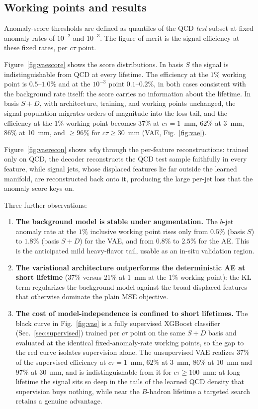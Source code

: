 \documentclass[a4paper,11pt]{article}
\newcommand{\ctau}{c\tau}
\begin{document}
\subsection{Working points and results}
\label{sec:adresults}

Anomaly-score thresholds are defined as quantiles of the QCD
\emph{test} subset at fixed anomaly rates of $10^{-2}$ and $10^{-3}$.
The figure of merit is the signal efficiency at these fixed rates,
per $\ctau$ point.

Figure~\ref{fig:vaescore} shows the score distributions. In basis $S$
the signal is indistinguishable from QCD at every lifetime. The
efficiency at the $1\%$ working point is $0.5$--$1.0\%$ and at the
$10^{-3}$ point $0.1$--$0.2\%$, in both cases consistent with the
background rate itself: the score carries no information about the
lifetime.
In basis $S{+}D$, with architecture, training, and working points
unchanged, the signal population migrates orders of magnitude into the
loss tail, and the efficiency at the $1\%$ working point becomes
$37\%$ at $\ctau = 1$~mm, $62\%$ at 3~mm, $86\%$ at 10~mm, and
$\geq 96\%$ for $\ctau \geq 30$~mm (VAE, Fig.~\ref{fig:vae}).

Figure~\ref{fig:vaerecon} shows \emph{why} through the per-feature
reconstructions: trained only on QCD, the decoder reconstructs the
QCD test sample faithfully in every feature, while signal jets,
whose displaced features lie far outside the learned manifold, are
reconstructed back onto it, producing the large per-jet loss that the
anomaly score keys on.

Three further observations:
\begin{enumerate}
  \item \textbf{The background model is stable under augmentation.}
  The $b$-jet anomaly rate at the $1\%$ inclusive working point rises
  only from $0.5\%$ (basis $S$) to $1.8\%$ (basis $S{+}D$) for the
  VAE, and from $0.8\%$ to $2.5\%$ for the AE.
  This is the anticipated mild heavy-flavor tail, usable as an in-situ
  validation region.
  \item \textbf{The variational architecture outperforms the
  deterministic AE at short lifetime} ($37\%$ versus $21\%$ at 1~mm at
  the $1\%$ working point): the KL term regularizes the background
  model against the broad displaced features that otherwise dominate
  the plain MSE objective.
  \item \textbf{The cost of model-independence is confined to short
  lifetimes.} The black curve in Fig.~\ref{fig:vae} is a
  fully supervised XGBoost classifier (Sec.~\ref{sec:supervised})
  trained per $\ctau$ point on the same $S{+}D$ basis and evaluated at
  the identical fixed-anomaly-rate working points, so the gap to the
  red curve isolates supervision alone. The unsupervised VAE realizes
  $37\%$ of the supervised efficiency at $\ctau = 1$~mm, $62\%$ at
  3~mm, $86\%$ at 10~mm and $97\%$ at 30~mm, and is indistinguishable
  from it for $\ctau \geq 100$~mm: at long lifetime the signal sits so
  deep in the tails of the learned QCD density that supervision buys
  nothing, while near the $B$-hadron lifetime a targeted search retains
  a genuine advantage.
\end{enumerate}
\end{document}
